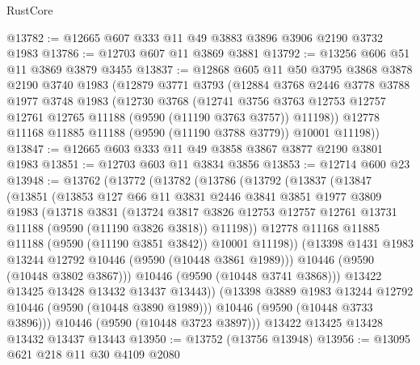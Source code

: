 \begin{lexlean}{RustCore}
\begin{coremodule}
@13782 := @12665 @607 @333 @11 @49 @3883 @3896 @3906 @2190 @3732 @1983
@13786 := @12703 @607 @11 @3869 @3881
@13792 := @13256 @606 @51 @11 @3869 @3879 @3455
@13837 := @12868
    @605
    @11
    @50
    @3795
    @3868
    @3878
    @2190
    @3740
    @1983
    (@12879
      @3771
      @3793
      (@12884
        @3768
        @2446
        @3778
        @3788
        @1977
        @3748
        @1983
        (@12730
          @3768
          (@12741
            @3756
            @3763
            @12753
            @12757
            @12761
            @12765
            @11188
            (@9590 (@11190 @3763 @3757))
            @11198))
        @12778
        @11168
        @11885
        @11188
        (@9590 (@11190 @3788 @3779))
        @10001
        @11198))
@13847 := @12665 @603 @333 @11 @49 @3858 @3867 @3877 @2190 @3801 @1983
@13851 := @12703 @603 @11 @3834 @3856
@13853 := @12714 @600 @23
@13948 := @13762
    (@13772
      (@13782
        (@13786
          (@13792
            (@13837
              (@13847
                (@13851
                  (@13853
                    @127
                    @66
                    @11
                    @3831
                    @2446
                    @3841
                    @3851
                    @1977
                    @3809
                    @1983
                    (@13718
                      @3831
                      (@13724
                        @3817
                        @3826
                        @12753
                        @12757
                        @12761
                        @13731
                        @11188
                        (@9590 (@11190 @3826 @3818))
                        @11198))
                    @12778
                    @11168
                    @11885
                    @11188
                    (@9590 (@11190 @3851 @3842))
                    @10001
                    @11198))
                (@13398 @1431 @1983 @13244 @12792 @10446 (@9590 (@10448 @3861 @1989)))
                @10446
                (@9590 (@10448 @3802 @3867)))
              @10446
              (@9590 (@10448 @3741 @3868)))
            @13422
            @13425
            @13428
            @13432
            @13437
            @13443))
        (@13398 @3889 @1983 @13244 @12792 @10446 (@9590 (@10448 @3890 @1989)))
        @10446
        (@9590 (@10448 @3733 @3896)))
      @10446
      (@9590 (@10448 @3723 @3897)))
    @13422
    @13425
    @13428
    @13432
    @13437
    @13443
@13950 := @13752 (@13756 @13948)
@13956 := @13095 @621 @218 @11 @30 @4109 @2080

\end{coremodule}
\end{lexlean}
